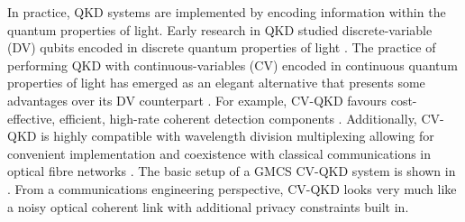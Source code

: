 ﻿\documentclass[12pt]{article}
\begin{document}
In practice, QKD systems are implemented by encoding information within the quantum properties of light. Early research in QKD studied discrete-variable (DV) qubits encoded in discrete quantum properties of light \cite{Scarani-2009, Bennett-1984}. The practice of performing QKD with continuous-variables (CV) encoded in continuous quantum properties of light has emerged as an elegant alternative that presents some advantages over its DV counterpart \cite{Cerf-2001, Grosshans-2003, Assche-2006, Cerf-2007, Weedbrook-2012, Diamanti-2015, Pirandola-2020, Zhang-2024a, Usenko-2025}. For example, CV-QKD favours cost-effective, efficient, high-rate coherent detection components \cite{Diamanti-2015, Tang-2020}. Additionally, CV-QKD is highly compatible with wavelength division multiplexing allowing for convenient implementation and coexistence with classical communications in optical fibre networks \cite{Kumar-2015, Duan-2023}. The basic setup of a GMCS CV-QKD system is shown in . From a communications engineering perspective, CV-QKD looks very much like a noisy optical coherent link with additional privacy constraints built in.
\end{document}
